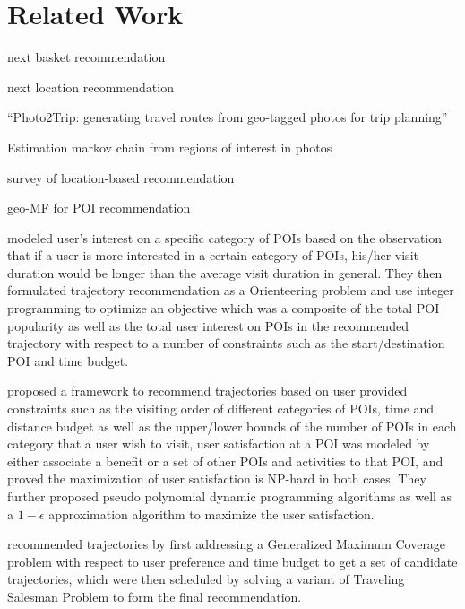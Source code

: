 
\section{Related Work}
\label{relatedwork}

next basket recommendation~\cite{fpmc10}

next location recommendation~\cite{ijcai13}

``Photo2Trip: generating travel routes from geo-tagged photos for trip planning''~\cite{lu2010photo2trip}

Estimation markov chain from regions of interest in photos~\cite{zheng2012patterns}

survey of location-based recommendation~\cite{bao2015recommendations}

geo-MF for POI recommendation~\cite{lian2014geomf}

\cite{ijcai15} modeled user's interest on a specific category of POIs based on the observation that if a user is more interested in a 
certain category of POIs, his/her visit duration would be longer than the average visit duration in general.
They then formulated trajectory recommendation as a Orienteering problem and use integer programming to optimize an objective
which was a composite of the total POI popularity as well as the total user interest on POIs in the recommended trajectory 
with respect to a number of constraints such as the start/destination POI and time budget.

\cite{wsdm14} proposed a framework to recommend trajectories based on user provided constraints such as the visiting order of different 
categories of POIs, time and distance budget as well as the upper/lower bounds of the number of POIs in each category that a user wish 
to visit, user satisfaction at a POI was modeled by either associate a benefit or a set of other POIs and activities to that POI,
and proved the maximization of user satisfaction is NP-hard in both cases. 
They further proposed pseudo polynomial dynamic programming algorithms as well as 
a $1-\epsilon$ approximation algorithm to maximize the user satisfaction.

\cite{tripbuilder15} recommended trajectories by first addressing a Generalized Maximum Coverage problem with respect to user preference and 
time budget to get a set of candidate trajectories, which were then scheduled by solving a variant of Traveling Salesman Problem to form the 
final recommendation.

